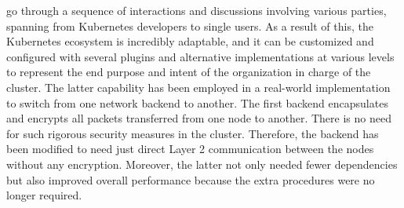 go through a sequence of interactions and discussions involving various parties,
spanning from Kubernetes developers to single users. As a result of this, the
Kubernetes ecosystem is incredibly adaptable, and it can be customized and configured
with several plugins and alternative implementations at various levels to represent
the end purpose and intent of the organization in charge of the cluster. The
latter capability has been employed in a real-world implementation to switch
from one network backend to another. The first backend encapsulates and encrypts
all packets transferred from one node to another. There is no need for such
rigorous security measures in the cluster. Therefore, the backend has been
modified to need just direct Layer 2 communication between the nodes without any
encryption. Moreover, the latter not only needed fewer dependencies but also
improved overall performance because the extra procedures were no longer
required.

